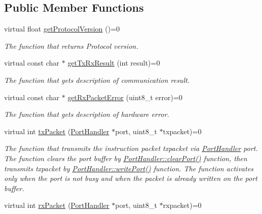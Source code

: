 \subsection*{Public Member Functions}
\begin{DoxyCompactItemize}
\item 
virtual float \hyperlink{classmercury_1_1_packet_handler_adddbcda3ac5e3fa954d57cce01d7d8b0}{get\+Protocol\+Version} ()=0
\begin{DoxyCompactList}\small\item\em The function that returns Protocol version. \end{DoxyCompactList}\item 
virtual const char $\ast$ \hyperlink{classmercury_1_1_packet_handler_a0c752d5086c323bb21b842d2162f7b3a}{get\+Tx\+Rx\+Result} (int result)=0
\begin{DoxyCompactList}\small\item\em The function that gets description of communication result. \end{DoxyCompactList}\item 
virtual const char $\ast$ \hyperlink{classmercury_1_1_packet_handler_a5c65f7193cdc11a03de69deae4fb0a88}{get\+Rx\+Packet\+Error} (uint8\+\_\+t error)=0
\begin{DoxyCompactList}\small\item\em The function that gets description of hardware error. \end{DoxyCompactList}\item 
virtual int \hyperlink{classmercury_1_1_packet_handler_acc3f84f0d952dc2d827d8500de512abe}{tx\+Packet} (\hyperlink{classmercury_1_1_port_handler}{Port\+Handler} $\ast$port, uint8\+\_\+t $\ast$txpacket)=0
\begin{DoxyCompactList}\small\item\em The function that transmits the instruction packet txpacket via \hyperlink{classmercury_1_1_port_handler}{Port\+Handler} port.  The function clears the port buffer by \hyperlink{classmercury_1_1_port_handler_accf37c8838c1ce3042a0127ceeb89c48}{Port\+Handler\+::clear\+Port()} function,  then transmits txpacket by \hyperlink{classmercury_1_1_port_handler_ad26c3a106d6b668b6fae3d2f0afeab9e}{Port\+Handler\+::write\+Port()} function.  The function activates only when the port is not busy and when the packet is already written on the port buffer. \end{DoxyCompactList}\item 
virtual int \hyperlink{classmercury_1_1_packet_handler_a01a3929c3514eac14b4ca5a61b498e20}{rx\+Packet} (\hyperlink{classmercury_1_1_port_handler}{Port\+Handler} $\ast$port, uint8\+\_\+t $\ast$rxpacket)=0

\end{DoxyCompactItemize}
